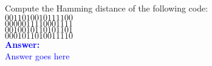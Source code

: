 \item{}
Compute the Hamming distance of the following code:\\[12pt]
$0011010010111100$\\[6pt]
$0000011110001111$\\[6pt]
$0010010110101101$\\[6pt]
$0001011010011110$\\[12pt]
\ifanswers
\textcolor{blue}{
\textbf{Answer:}\\
Answer goes here
}
\newpage
\fi

